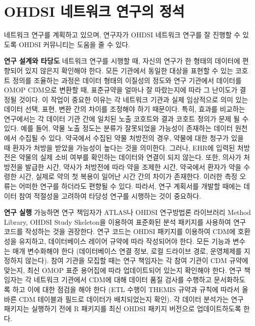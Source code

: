 \documentclass[10.5pt]{book}
\theoremstyle{definition}
\theoremstyle{definition}
\theoremstyle{definition}
\theoremstyle{remark}
\begin{document}
\section{OHDSI 네트워크 연구의 정석}\label{ohdsi---}


네트워크 연구를 계획하고 있으며, 연구자가 OHDSI 네트워크 연구를 잘
진행할 수 있도록 OHDSI 커뮤니티는 도움을 줄 수 있다.

\textbf{연구 설계와 타당도} 네트워크 연구를 시행할 때, 자신의 연구가 한
형태의 데이터에 편향되어 있지 않은지 확인해야 한다. 모든 기관에서 동일한
대상을 표현할 수 있는 코호트 정의를 조율하는 과정은 데이터 형태의
이질성의 정도와 연구 기관에서 데이터를 OMOP CDM으로 변환할 때,
표준규약을 얼마나 잘 따랐는지에 따라 그 난이도가 결정될 것이다. 이
작업이 중요한 이유는 각 네트워크 기관과 실제 임상적으로 의미 있는 데이터
선택, 표현, 변환 간의 차이를 조정해야 하기 때문이다. 특히, 효과를
비교하는 연구에서는 각 데이터 기관 간에 일치된 노출 코호트와 결과 코호트
정의가 문제 될 수 있다. 예를 들어, 약물 노출 정도는 분류가 잘못되었을
가능성이 존재하는 데이터 원천에서 수집될 수 있다. 약국에서 수집된 약물
처방전의 경우, 약물에 대한 청구가 있을 때 환자가 처방을 받았을 가능성이
높다는 것을 의미한다. 그러나, EHR에 입력된 처방전은 약물의 실제 소비
여부를 확인하는 데이터와 연결이 되지 않는다. 또한, 의사가 처방전을
발급한 시간, 약사가 처방전에 따라 약을 조제한 시간, 약국에서 환자가 약을
수령한 시간, 실제로 약의 첫 복용이 일어난 시간 간의 차이가 존재한다.
이러한 측정 오류는 어떠한 연구를 하더라도 편향될 수 있다. 따라서, 연구
계획서를 개발할 때에는 데이터 참여 적절성을 고려하여 타당성 연구를
시행하는 것이 중요하다.

\textbf{연구 실행} 가능하면 연구 책임자가 ATLAS나 OHDSI 연구방법론
라이브러리 Method Library, OHDSI Study Skeleton을 이용하여 표준화된 분석
패키지를 사용하여 연구 코드를 작성하는 것을 권장한다. 연구 코드는 OHDSI
패키지를 이용하여 CDM에 호환성을 유지하고, 데이터베이스 레이어 규약에
따라 작성되어야 한다. 모든 기능과 변수는 매개 변수화해야 한다
(데이터베이스 연결 정보, 로컬 드라이브 경로, 운영체제를 지정하지
않는다). 참여 기관을 모집할 때는 연구 책임자는 각 참여 기관이 CDM 규약에
맞는지, 최신 OMOP 표준 용어집에 따라 업데이트되어 있는지 확인해야 한다.
연구 책임자는 각 네트워크 기관에서 CDM에 대해 데이터 품질 검사를
수행하고 문서화하도록 하고 이에 대한 점검을 해야 한다 (ETL 수행이 THEMIS
규약과 규칙에 따라서 올바른 CDM 테이블과 필드로 데이터가 배치되었는지
확인). 각 데이터 분석가는 연구 패키지는 실행하기 전에 R 패키지를 최신
OHDSI 패키지 버전으로 업데이트하도록 한다.
\end{document}
